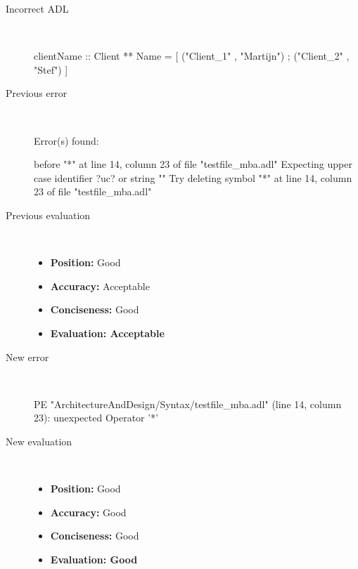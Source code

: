 \begin{description}
  \item[Incorrect ADL]~\\
\begin{adl}
clientName :: Client ** Name =
    [ ("Client_1"      , "Martijn")
    ; ("Client_2"      , "Stef")
    ]\end{adl}
  \item[Previous error]~\\
\begin{haskell}
Error(s) found:

before "*" at line 14, column 23 of file "testfile_mba.adl"
Expecting upper case identifier ?uc? or string ""
Try deleting symbol "*" at line 14, column 23 of file "testfile_mba.adl"\end{haskell}
  \item[Previous evaluation]~\\
    \begin{itemize}
    \item \textbf{Position:} Good
    \item \textbf{Accuracy:} Acceptable
    \item \textbf{Conciseness:} Good
    \item \textbf{Evaluation: Acceptable}
    \end{itemize}
  \item[New error]~\\
\begin{haskell}
PE "ArchitectureAndDesign/Syntax/testfile_mba.adl" (line 14, column 23):
unexpected Operator '*'\end{haskell}
  \item[New evaluation]~\\
    \begin{itemize}
    \item \textbf{Position:} Good
    \item \textbf{Accuracy:} Good
    \item \textbf{Conciseness:} Good
    \item \textbf{Evaluation: Good}
    \end{itemize}
  \end{description}

\hrulefill

